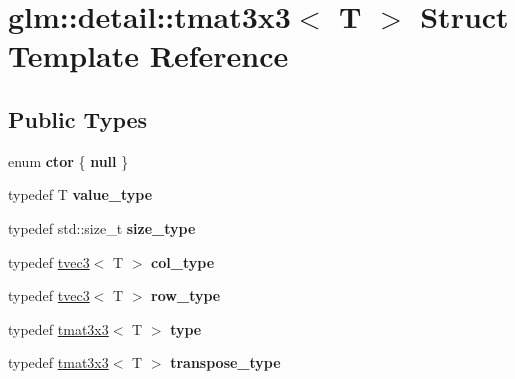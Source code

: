 \hypertarget{structglm_1_1detail_1_1tmat3x3}{\section{glm\-:\-:detail\-:\-:tmat3x3$<$ T $>$ Struct Template Reference}
\label{structglm_1_1detail_1_1tmat3x3}
}
\subsection*{Public Types}
\begin{DoxyCompactItemize}
\item 
enum {\bfseries ctor} \{ {\bfseries null}
 \}
\item 
\hypertarget{structglm_1_1detail_1_1tmat3x3_aab4f85e201efbee89e6da484930a2dc8}{typedef T {\bfseries value\-\_\-type}}\label{structglm_1_1detail_1_1tmat3x3_aab4f85e201efbee89e6da484930a2dc8}

\item 
\hypertarget{structglm_1_1detail_1_1tmat3x3_aba8dbcfaebb2bff81e45ec6a5b405629}{typedef std\-::size\-\_\-t {\bfseries size\-\_\-type}}\label{structglm_1_1detail_1_1tmat3x3_aba8dbcfaebb2bff81e45ec6a5b405629}

\item 
\hypertarget{structglm_1_1detail_1_1tmat3x3_ad0e2472707a4ef5ebdb99d01f265cfd5}{typedef \hyperlink{structglm_1_1detail_1_1tvec3}{tvec3}$<$ T $>$ {\bfseries col\-\_\-type}}\label{structglm_1_1detail_1_1tmat3x3_ad0e2472707a4ef5ebdb99d01f265cfd5}

\item 
\hypertarget{structglm_1_1detail_1_1tmat3x3_a6d6d712e55dac6fa3660ea23923ed62e}{typedef \hyperlink{structglm_1_1detail_1_1tvec3}{tvec3}$<$ T $>$ {\bfseries row\-\_\-type}}\label{structglm_1_1detail_1_1tmat3x3_a6d6d712e55dac6fa3660ea23923ed62e}

\item 
\hypertarget{structglm_1_1detail_1_1tmat3x3_a16d3ade773d7ecdee78f54f9c8b355fd}{typedef \hyperlink{structglm_1_1detail_1_1tmat3x3}{tmat3x3}$<$ T $>$ {\bfseries type}}\label{structglm_1_1detail_1_1tmat3x3_a16d3ade773d7ecdee78f54f9c8b355fd}

\item 
\hypertarget{structglm_1_1detail_1_1tmat3x3_a8297942592cc441994c1a8b55119d6a7}{typedef \hyperlink{structglm_1_1detail_1_1tmat3x3}{tmat3x3}$<$ T $>$ {\bfseries transpose\-\_\-type}}\label{structglm_1_1detail_1_1tmat3x3_a8297942592cc441994c1a8b55119d6a7}

\end{DoxyCompactItemize}
